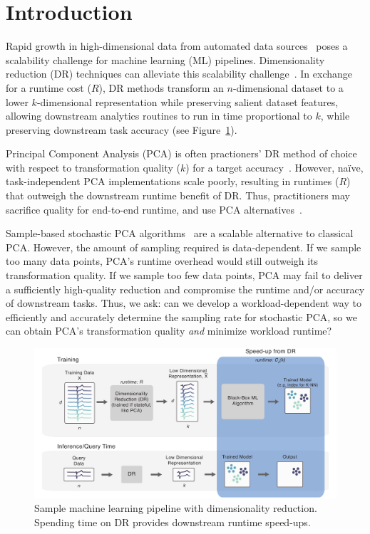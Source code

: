
\section{Introduction}
\label{sec:intro}

Rapid growth in high-dimensional data from automated data sources~\cite{plato,macrobase-cidr} poses a scalability challenge for machine learning (ML) pipelines.
Dimensionality reduction (DR) techniques can alleviate this scalability challenge~\cite{keogh-indexing,local-dr,decade,gemini}.
In exchange for a runtime cost ($R$), DR methods transform an $n$-dimensional dataset to a lower $k$-dimensional representation while preserving salient dataset features, allowing downstream analytics routines to run in time proportional to $k$, while preserving downstream task accuracy (see Figure~\ref{fig:pipeline}).

Principal Component Analysis (PCA) is often practioners' DR method of choice with respect to transformation quality ($k$) for a target accuracy~\cite{jolbook}. 
However, na\"{i}ve, task-independent PCA implementations scale poorly, resulting in runtimes ($R$) that outweigh the downstream runtime benefit of DR. 
Thus, practitioners may sacrifice quality for end-to-end runtime, and use PCA alternatives~\cite{keogh-study}. 

Sample-based stochastic PCA algorithms~\cite{shamir,re-new} are a scalable alternative to classical PCA.
However, the amount of sampling required is data-dependent.
If we sample too many data points, PCA's runtime overhead would still outweigh its transformation quality.
If we sample too few data points, PCA may fail to deliver a sufficiently high-quality reduction and compromise the runtime and/or accuracy of downstream tasks.
Thus, we ask: can we develop a workload-dependent way to efficiently and accurately determine the sampling rate for stochastic PCA, so we can obtain PCA's transformation quality \emph{and} minimize workload runtime?

\begin{figure}
\includegraphics[width=\linewidth]{figs/pipeline.pdf}
\caption[]{Sample machine learning pipeline with dimensionality reduction. Spending time on DR provides downstream runtime speed-ups.}
\label{fig:pipeline}
\end{figure}

